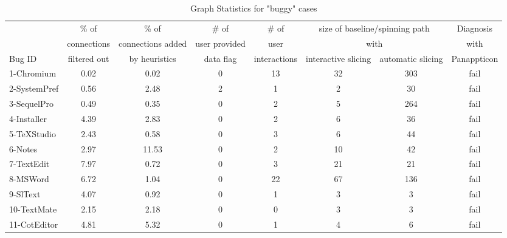 \begin{table*}[ht]
\footnotesize
\centering
  \begin{tabularx}{\textwidth}{l|ccccccc}
 	   & \% of & \% of & \# of& \# of & \multicolumn{2}{c}{size of baseline/spinning path}& Diagnosis\\
       & connections & connections added  & user provided & user  & \multicolumn{2}{c}{with}  &  with\\
Bug ID & filtered out & by heuristics & data flag & interactions & interactive slicing & automatic slicing & Panappticon\\
\hline
\hline
1-Chromium & 0.02 & 0.02 & 0 & 13 & 32 & 303 & fail\\
2-SystemPref & 0.56 & 2.48 & 2 & 1 & 2 & 30 & fail\\
3-SequelPro & 0.49 & 0.35 & 0 & 2 & 5 & 264 & fail\\
4-Installer & 4.39 & 2.83 & 0 & 2 & 6 & 36  & fail\\
5-TeXStudio & 2.43 & 0.58 & 0 & 3 & 6 & 44  & fail\\
6-Notes & 2.97 & 11.53 & 0 & 2 & 10 & 42 & fail\\
7-TextEdit & 7.97 & 0.72 & 0 & 3 & 21 & 21 & fail\\
8-MSWord & 6.72 & 1.04 & 0 & 22 & 67 & 136 & fail\\
9-SlText & 4.07 & 0.92 & 0 & 1 & 3 & 3 & fail\\
10-TextMate & 2.15 & 2.18 & 0 & 0 & 3 & 3 & fail\\
11-CotEditor & 4.81 & 5.32 & 0 & 1 & 4 & 6 & fail\\
\hline
  \end{tabularx}
  \parbox{\textwidth}
  {\caption{Graph Statistics for "buggy" cases} 
    {
    }
  \label{table:results}
  }

\end{table*}


